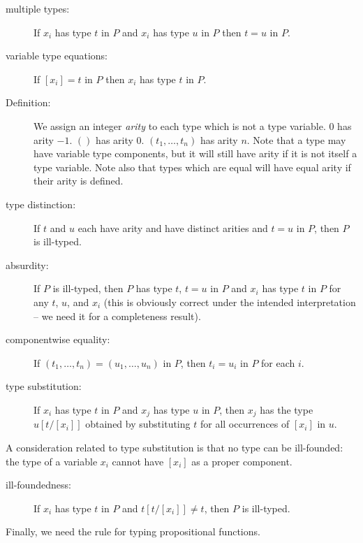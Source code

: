 \documentclass{article}
\begin{document}
\begin{description}

\item[multiple types:]  If $x_i$ has type $t$ in $P$ and $x_i$ has type $u$ in $P$
then $t=u$ in $P$.

\item[variable type equations:]  If $[x_i]=t$ in $P$ then $x_i$ has type $t$ in $P$.

\item[Definition:] We assign an integer {\em arity\/} to each type
which is not a type variable.  $0$ has arity $-1$.  $()$ has arity 0.
$(t_1,\ldots,t_n)$ has arity $n$.  Note that a type may have variable
type components, but it will still have arity if it is not itself a
type variable.  Note also that types which are equal will have equal
arity if their arity is defined.

\item[type distinction:] If $t$ and $u$ each have arity and have
distinct arities and $t=u$ in $P$, then $P$ is ill-typed.

\item[absurdity:] If $P$ is ill-typed, then $P$ has type $t$, $t=u$ in
$P$ and $x_i$ has type $t$ in $P$ for any $t$, $u$, and $x_i$ (this is
obviously correct under the intended interpretation -- we need it for a
completeness result).

\item[componentwise equality:] If $(t_1,\ldots,t_n) =
(u_1,\ldots,u_n)$ in $P$, then $t_i=u_i$ in $P$ for each $i$.

\item[type substitution:] If $x_i$ has type $t$ in $P$ and $x_j$ has
type $u$ in $P$, then $x_j$ has the type $u[t/[x_i]]$ obtained by
substituting $t$ for all occurrences of $[x_i]$ in $u$.

\end{description}

A consideration related to type substitution is that no type can be
ill-founded: the type of a variable $x_i$ cannot have $[x_i]$ as a
proper component.

\begin{description}

\item[ill-foundedness:] If $x_i$ has type $t$ in $P$ and $t[t/[x_i]]
\neq t$, then $P$ is ill-typed.

\end{description}

Finally, we need the rule for typing propositional functions.
\end{document}

